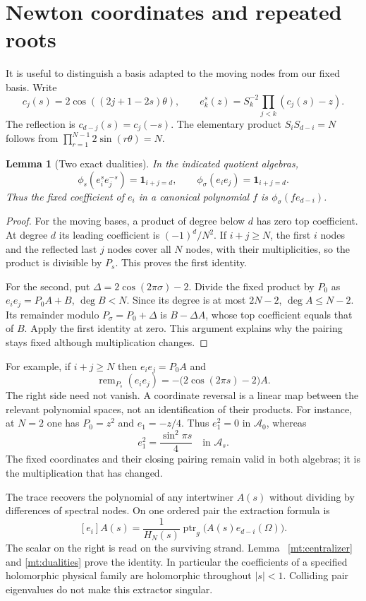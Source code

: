 \documentclass[11pt]{article}
\numberwithin{equation}{section}
\newtheorem{lemma}[theorem]{Lemma}
\theoremstyle{definition}\newtheorem{definition}[theorem]{Definition}
\theoremstyle{remark}\newtheorem{remark}[theorem]{Remark}
\newcommand{\ptr}{\operatorname{ptr}}
\newcommand{\remd}{\operatorname{rem}}
\newcommand{\Acal}{\mathcal A}
\begin{document}
\section{Newton coordinates and repeated roots}
It is useful to distinguish a basis adapted to the moving nodes from
our fixed basis. Write
\[
 c_j(s)=2\cos((2j+1-2s)\theta),\qquad
 e_k^s(z)=S_k^{-2}\prod_{j<k}(c_j(s)-z).
\]
The reflection is $c_{d-j}(s)=c_j(-s)$. The elementary product
$S_iS_{d-i}=N$ follows from $\prod_{r=1}^{N-1}2\sin(r\theta)=N$.

\begin{lemma}[Two exact dualities]\label{mt:dual-bases}
In the indicated quotient algebras,
\begin{equation}\label{mt:dualities}
 \phi_s(e_i^s e_j^{-s})=\mathbf1_{i+j=d},\qquad
 \phi_\sigma(e_i e_j)=\mathbf1_{i+j=d}.
\end{equation}
Thus the fixed coefficient of $e_i$ in a canonical polynomial $f$ is
$\phi_\sigma(f e_{d-i})$.
\end{lemma}
\begin{proof}
For the moving bases, a product of degree below $d$ has zero top
coefficient. At degree $d$ its leading coefficient is $(-1)^d/N^2$.
If $i+j\ge N$, the first $i$ nodes and the reflected last $j$ nodes
cover all $N$ nodes, with their multiplicities, so the product is
divisible by $P_s$. This proves the first identity.

For the second, put $\Delta=2\cos(2\pi\sigma)-2$. Divide the fixed
product by $P_0$ as $e_ie_j=P_0A+B$, $\deg B<N$. Since its degree
is at most $2N-2$, $\deg A\le N-2$. Its remainder modulo
$P_\sigma=P_0+\Delta$ is $B-\Delta A$, whose top coefficient equals
that of $B$. Apply the first identity at zero. This argument explains
why the pairing stays fixed although multiplication changes.
\end{proof}

For example, if $i+j\ge N$ then $e_ie_j=P_0A$ and
\[
 \remd_{P_s}(e_ie_j)=-\bigl(2\cos(2\pi s)-2\bigr)A.
\]
The right side need not vanish. A coordinate reversal is a linear map
between the relevant polynomial spaces, not an identification of their
products.
For instance, at $N=2$ one has $P_0=z^2$ and $e_1=-z/4$.
Thus $e_1^2=0$ in $\Acal_0$, whereas
\[
 e_1^2=\frac{\sin^2\pi s}{4}\quad\text{in }\Acal_s.
\]
The fixed coordinates and their closing pairing remain valid in both
algebras; it is the multiplication that has changed.

The trace recovers the polynomial of any intertwiner $A(s)$ without
dividing by differences of spectral nodes. On one ordered pair the
extraction formula is
\begin{equation}\label{mt:extract}
 [e_i]A(s)=\frac{1}{H_N(s)}
       \ptr_{g}\bigl(A(s)e_{d-i}(\Omega)\bigr).
\end{equation}
The scalar on the right is read on the surviving strand. Lemma~
\ref{mt:centralizer} and \eqref{mt:dualities} prove the identity.
In particular the coefficients of a specified holomorphic physical
family are holomorphic throughout $|s|<1$. Colliding pair eigenvalues
do not make this extractor singular.
\end{document}
